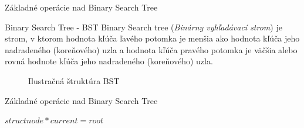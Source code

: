 \documentclass[11pt]{beamer}
\begin{document}
\begin{frame}{Základné operácie nad Binary Search Tree}
\begin{block}{Binary Search Tree - BST}
Binary Search tree (\emph{Binárny vyhľadávací strom}) je strom, v ktorom hodnota kľúča ľavého potomka je menšia ako hodnota kľúča jeho nadradeného (koreňového) uzla a hodnota kľúča pravého potomka je väčšia alebo rovná hodnote kľúča jeho nadradeného (koreňového) uzla.
\end{block}

\begin{figure}[h]\label{BST}
\caption{Ilustračná štruktúra BST}
\end{figure}
\end{frame}

\begin{frame}{Základné operácie nad Binary Search Tree}

\begin{algorithm}[H]
\caption{Search operation}\label{search}
\SetNlSkip{-1.2em}
\SetInd{1em}{1em}
\SetNlSty{}{}{:}

\Indp\Indpp
\BlankLine
$struct node *current = root$\\
\end{algorithm}
\end{frame}
\end{document}
